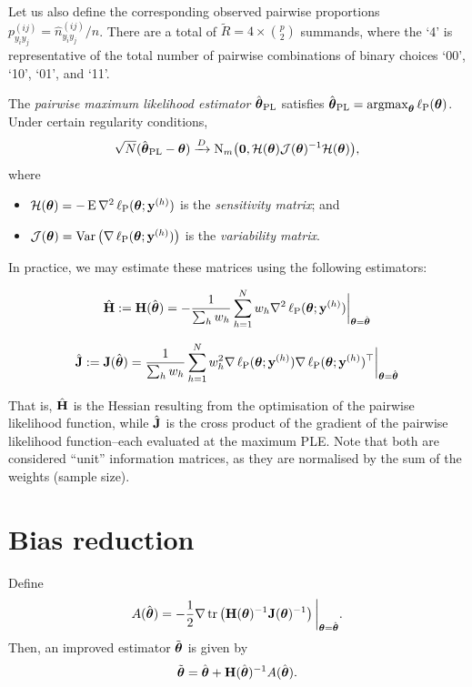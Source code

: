\documentclass[
]{article}
\providecommand{\tightlist}{%
  \setlength{\itemsep}{0pt}\setlength{\parskip}{0pt}}
\begin{document}
Let us also define the corresponding observed pairwise proportions
\(p_{y_iy_j}^{(ij)} = \hat n_{y_iy_j}^{(ij)}/n\). There are a total of
\(\tilde R = 4 \times {p \choose 2}\) summands, where the `4' is
representative of the total number of pairwise combinations of binary
choices `00', `10', `01', and `11'.

The \emph{pairwise maximum likelihood estimator}
\(\hat{{\boldsymbol\theta}}_{\text{PL}}\) satisfies
\(\hat{{\boldsymbol\theta}}_{\text{PL}}= \operatorname{argmax}_{{\boldsymbol\theta}} \operatorname{\ell_P}({\boldsymbol\theta})\).
Under certain regularity conditions, \begin{equation}
\sqrt N (\hat{{\boldsymbol\theta}}_{\text{PL}}- {\boldsymbol\theta}) \xrightarrow{D} {\operatorname{N}}_m\big({\mathbf 0}, {\mathcal H}({\boldsymbol\theta}){\mathcal J}({\boldsymbol\theta})^{-1}{\mathcal H}({\boldsymbol\theta})\big),
\end{equation} where

\begin{itemize}
\tightlist
\item
  \({\mathcal H}({\boldsymbol\theta})=-\operatorname{E}\nabla^2\operatorname{\ell_P}({\boldsymbol\theta};{\mathbf y}^{(h)})\)
  is the \emph{sensitivity matrix}; and
\item
  \({\mathcal J}({\boldsymbol\theta})=\operatorname{Var}\big( \nabla\operatorname{\ell_P}({\boldsymbol\theta};{\mathbf y}^{(h)})\big)\)
  is the \emph{variability matrix}.
\end{itemize}

In practice, we may estimate these matrices using the following
estimators:

\[
\hat{{\mathbf H}} := {\mathbf H}(\hat{{\boldsymbol\theta}})  = -\frac{1}{\sum_h w_h}\sum_{h=1}^N w_h\nabla^2\operatorname{\ell_P}({\boldsymbol\theta};{\mathbf y}^{(h)}) \bigg|_{{\boldsymbol\theta} = \hat{{\boldsymbol\theta}}}
\]

\[
\hat{{\mathbf J}} := {\mathbf J}(\hat{{\boldsymbol\theta}}) = \frac{1}{\sum_h w_h}\sum_{h=1}^N w_h^2\nabla\operatorname{\ell_P}({\boldsymbol\theta};{\mathbf y}^{(h)})\nabla\operatorname{\ell_P}({\boldsymbol\theta};{\mathbf y}^{(h)})^\top \bigg|_{{\boldsymbol\theta} = \hat{{\boldsymbol\theta}}}
\]

That is, \(\hat{{\mathbf H}}\) is the Hessian resulting from the optimisation of
the pairwise likelihood function, while \(\hat{{\mathbf J}}\) is the cross product
of the gradient of the pairwise likelihood function--each evaluated at
the maximum PLE. Note that both are considered ``unit'' information
matrices, as they are normalised by the sum of the weights (sample
size).

\hypertarget{bias-reduction}{%
\section{Bias reduction}\label{bias-reduction}}

Define \[
A(\hat{{\boldsymbol\theta}}) = - \frac{1}{2} \nabla \operatorname{tr}\left( {\mathbf H}({\boldsymbol\theta})^{-1}{\mathbf J}({\boldsymbol\theta})^{-1} \right) \bigg|_{{\boldsymbol\theta} = \hat{{\boldsymbol\theta}}} .
\] Then, an improved estimator \(\tilde{{\boldsymbol\theta}}\) is given by \[
\tilde{{\boldsymbol\theta}} = \hat{{\boldsymbol\theta}} + {\mathbf H}(\hat{{\boldsymbol\theta}})^{-1}A(\hat{{\boldsymbol\theta}}).
\]
\end{document}
